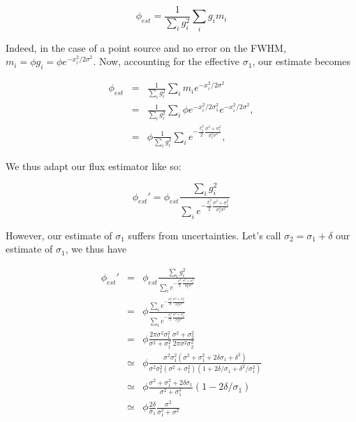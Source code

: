 \begin{equation}
\phi_{est} = \frac{1}{\sum_i g_i^2}\sum_i g_im_i
\end{equation}

Indeed, in the case of a point source and no error on the FWHM, $m_i = \phi
g_i = \phi e^{-x_i^2/2\sigma^2}$. Now, accounting for the effective $\sigma_1$, our estimate becomes

\begin{eqnarray}
\phi_{est} &=& \frac{1}{\sum_i g_i^2}\sum_i m_ie^{-x_i^2/2\sigma^2} \nonumber\\
&= & \frac{1}{\sum_i g_i^2}\sum_i \phi e^{-x_i^2/2\sigma_1^2} e^{-x_i^2/2\sigma^2}
, \nonumber \\
 &=&\phi\frac{1}{\sum_i g_i^2}\sum_i e^{-\frac{x_i^2}{2}\frac{\sigma^2+\sigma_1^2}{\sigma_1^2\sigma^2}},
\end{eqnarray}

We thus adapt our flux estimator like so:

\begin{equation}
\phi_{est}' = \phi_{est}\frac{\sum_i g_i^2}{\sum_i
  e^{-\frac{x_i^2}{2}\frac{\sigma^2+\sigma_1^2}{\sigma_1^2\sigma^2}}}
\end{equation}

However, our estimate of $\sigma_1$ suffers from uncertainties. Let's call
$\sigma_2 = \sigma_1 + \delta$ our estimate of $\sigma_1$, we thus have

\begin{eqnarray}
\phi_{est}' &=& \phi_{est}\frac{\sum_i g_i^2}{\sum_i
  e^{-\frac{x_i^2}{2}\frac{\sigma^2+\sigma_2^2}{\sigma_2^2\sigma^2}}} \nonumber \\
&=& \phi\frac{\sum_i
  e^{-\frac{x_i^2}{2}\frac{\sigma^2+\sigma_1^2}{\sigma_1^2\sigma^2}}}{\sum_i
  e^{-\frac{x_i^2}{2}\frac{\sigma^2+\sigma_2^2}{\sigma_2^2\sigma^2}}}
\nonumber\\
&=&
\phi\frac{2\pi\sigma^2\sigma_1^2}{\sigma^2+\sigma_1^2}\frac{\sigma^2+\sigma_2^2}{2\pi\sigma^2\sigma_2^2}
\nonumber \\
&\simeq&\phi\frac{\sigma^2\sigma_1^2(\sigma^2+\sigma_1^2+2\delta\sigma_1+\delta^2)}{\sigma^2\sigma_1^2(\sigma^2+\sigma_1^2)(1+2\delta/\sigma_1+
  \delta^2/\sigma_1^2)} \nonumber \\
&\simeq& \phi\frac{\sigma^2+\sigma_1^2+2\delta\sigma_1}{\sigma^2+\sigma_1^2}(1-2\delta/\sigma_1)\nonumber\\
&\simeq& \phi \frac{2\delta}{\sigma_1}\frac{\sigma^2}{\sigma_1^2+\sigma^2}
\end{eqnarray}

